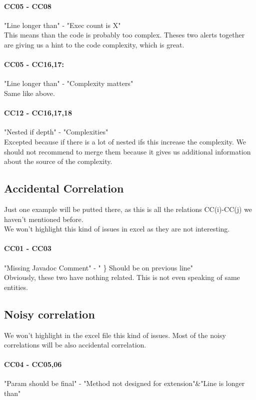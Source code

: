 \documentclass{article}
\begin{document}
\paragraph{CC05  - CC08} 
"Line longer than" - "Exec count is X"  \\
This means than the code is probably too complex. Theses two alerts together are giving us a hint to the code complexity, which is great.
\paragraph{CC05  - CC16,17:  }
"Line longer than" - "Complexity matters" \\
Same like above.

\paragraph{CC12 - CC16,17,18}
"Nested if depth" - "Complexities" \\
Excepted because if there is a lot of nested ifs this increase the complexity. We should not recommend to merge them because it gives us additional information about the source of the complexity.



\subsection{Accidental Correlation}
Just one example will be putted there, as this is all the relations CC(i)-CC(j) we haven't mentioned before. \\ We won't highlight this kind of issues in excel as they are not interesting.
\paragraph{CC01 - CC03}
"Missing Javadoc Comment" -  " \} Should be on previous line" \\
Obviously, these two have nothing related. This is not even speaking of same entities.

\subsection{Noisy correlation}
We won't highlight in the excel file this kind of issues. Most of the noisy correlations will be also accidental correlation.
\paragraph{CC04 - CC05,06}
 "Param should be final" -  "Method not designed for extension"\&"Line is longer than"
\end{document}
